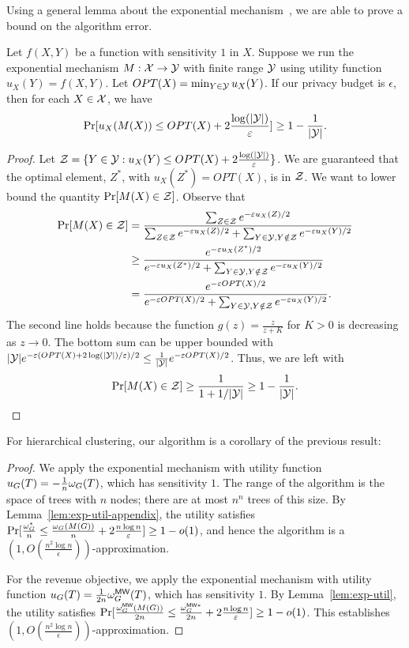 Using a general lemma about the exponential mechanism~\citep{mcsherry2007mechanism}, we are able to prove a bound on the algorithm error.
\begin{lem}\label{lem:exp-util-appendix}
Let $f(X,Y)$ be a function with sensitivity $1$ in $X$.
Suppose we run the exponential mechanism $M : \mathcal{X} \rightarrow \mathcal{Y}$ with finite range $\mathcal{Y}$ using utility function $u_X(Y) = f(X,Y)$. Let $OPT(X) = \min_{Y \in \mathcal{Y}} u_X(Y)$. If our privacy budget is $\epsilon$, then for each $X \in \mathcal{X}$, we have
\[
    \Pr[u_X(M(X)) \leq OPT(X) + 2\frac{\log(|\mathcal{Y}|)}{\varepsilon}] \geq 1-\frac{1}{|\mathcal{Y}|}.
\]
\end{lem}
\begin{proof}
    Let $\mathcal{Z} = \{Y \in \mathcal{Y} : u_X(Y) \leq OPT(X) + 2\frac{\log(|\mathcal{Y}|)}{\varepsilon}\}$. We are guaranteed that the optimal element, $Z^*$, with $u_X(Z^*) = OPT(X)$, is in $\mathcal{Z}$. We want to lower bound the quantity $\Pr[M(X) \in \mathcal{Z}]$. Observe that
    \begin{align*}
        \Pr[M(X) \in \mathcal{Z}] &= \frac{\sum_{Z \in \mathcal{Z}} e^{-\varepsilon u_X(Z)/2}}{\sum_{Z \in \mathcal{Z}} e^{-\varepsilon u_X(Z)/2} + \sum_{Y \in \mathcal{Y}, Y \notin \mathcal{Z}} e^{-\varepsilon u_X(Y)/2}} \\
        &\geq \frac{e^{-\varepsilon u_X(Z^*)/2}}{e^{-\varepsilon u_X(Z^*)/2} + \sum_{Y \in \mathcal{Y}, Y \notin \mathcal{Z}} e^{-\varepsilon u_X(Y)/2}} \\
        &= \frac{e^{-\varepsilon OPT(X)/2}}{e^{-\varepsilon OPT(X)/2} + \sum_{Y \in \mathcal{Y}, Y \notin \mathcal{Z}} e^{-\varepsilon u_X(Y)/2}}.
    \end{align*}
    The second line holds because the function $g(z) = \frac{z}{z+K}$ for $K > 0$ is decreasing as $z \rightarrow 0$. The bottom sum can be upper bounded with $|\mathcal{Y}| e^{-\varepsilon (OPT(X) + 2\log(|\mathcal{Y}|) / \varepsilon)/2} \leq \frac{1}{|\mathcal{Y}|} e^{-\varepsilon OPT(X)/2}$. Thus, we are left with
    \[
        \Pr[M(X) \in \mathcal{Z}] \geq \frac{1}{1 + 1 / |\mathcal{Y}|} \geq 1-\frac{1}{|\mathcal{Y}|}.
    \]
\end{proof}
For hierarchical clustering, our algorithm is a corollary of the previous result:

\begin{proof}
We apply the exponential mechanism with utility function $u_G(T) = -\frac{1}{n} \omega_G(T)$, which has sensitivity $1$. The range of the algorithm is the space of trees with $n$ nodes; there are at most $n^n$ trees of this size. By Lemma~\ref{lem:exp-util-appendix}, the utility satisfies $\Pr[ \frac{\omega_G^*}{n} \leq \frac{\omega_G(M(G))}{n} + 2 \frac{n \log n}{\varepsilon}] \geq 1-o(1)$, and hence the algorithm is a $(1, O(\frac{n^2 \log n}{\epsilon}))$-approximation. 

For the revenue objective, we apply the exponential mechanism with utility function $u_G(T) = \frac{1}{2n} \omega_G^{\textsf{MW}}(T)$, which has sensitivity $1$. By Lemma~\ref{lem:exp-util}, the utility satisfies $\Pr[\frac{\omega_G^{\textsf{MW}}(M(G))}{2n} \leq \frac{\omega_G^{\textsf{MW}*}}{2n} + 2 \frac{n \log n}{\varepsilon}] \geq 1-o(1)$. This establishes $(1, O(\frac{n^2\log n}{\epsilon}))$-approximation.
\end{proof}


